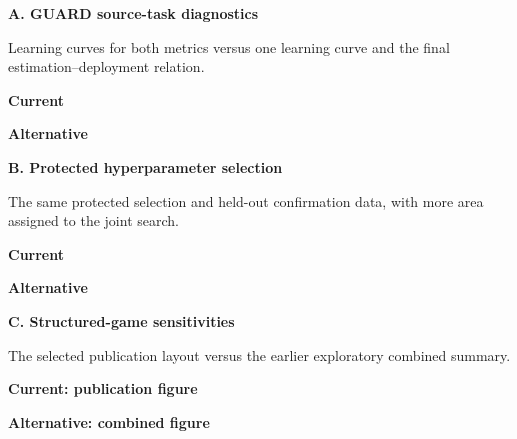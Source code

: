 \documentclass{article}
\newcommand{\comparisontitle}[2]{%
  {\Large\bfseries #1\par}%
  \vspace{0.08in}%
  {\small\color{mairlMuted}#2\par}%
  \vspace{0.18in}%
}
\newcommand{\paneltitle}[1]{%
  {\large\bfseries #1\par}%
  \vspace{0.10in}%
}
\newcommand{\singlecomparison}[4]{%
  \comparisontitle{#1}{#2}
  \begin{minipage}[t]{0.485\textwidth}
    \centering
    \paneltitle{Current}
    \resizebox{\linewidth}{!}{}
  \end{minipage}%
  \hfill
  \begin{minipage}[t]{0.485\textwidth}
    \centering
    \paneltitle{Alternative}
    \resizebox{\linewidth}{!}{}
  \end{minipage}
}
\begin{document}
\singlecomparison
  {A. GUARD source-task diagnostics}
  {Learning curves for both metrics versus one learning curve and the final estimation--deployment relation.}
  {reproducibility/tex/generated/appendix/i1_source_diagnostics}
  {reproducibility/alternatives/generated/lobeke_relation}

\clearpage
\singlecomparison
  {B. Protected hyperparameter selection}
  {The same protected selection and held-out confirmation data, with more area assigned to the joint search.}
  {reproducibility/tex/generated/appendix/i1_hyperparameters}
  {reproducibility/alternatives/generated/lobeke_tuning_spacious}

\clearpage
\comparisontitle
  {C. Structured-game sensitivities}
  {The selected publication layout versus the earlier exploratory combined summary.}
\begin{minipage}[t]{0.485\textwidth}
  \centering
  \paneltitle{Current: publication figure}
  \resizebox{\linewidth}{!}{%
  }
\end{minipage}%
\hfill
\begin{minipage}[t]{0.485\textwidth}
  \centering
  \paneltitle{Alternative: combined figure}
  \vspace{1.27in}
  \resizebox{\linewidth}{!}{%
  }
\end{minipage}
\end{document}
